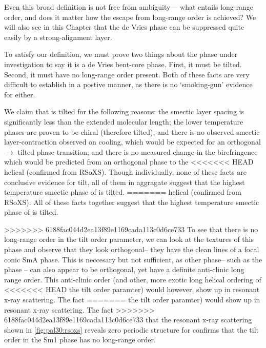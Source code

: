 \documentclass[aagreenthesis]{subfiles}
\begin{document}
Even this broad definition is not free from ambiguity--- what entails long-range
order, and does it matter how the escape from long-range order is achieved? We will also see in this Chapter that the de Vries phase can be
suppressed quite easily by a strong-alignment layer.



To satisfy our definition, we must prove two things about the phase under
investigation to say it is a de Vries bent-core phase. First, it must be tilted.
Second, it must have no long-range order present. Both of these facts are very
difficult to establish in a postive manner, as there is no `smoking-gun'
evidence for either.

We claim that \nfour{} is tilted for the following reasons: the smectic layer spacing is
significantly less than the extended molecular length; the lower temperature
phases are proven to be chiral (therefore tilted), and there is no observed
smectic layer-contraction observed on cooling, which would be expected for an
orthogonal$\rightarrow$ tilted phase transition; and there is no measured change in the birefringence which would be predicted from an orthogonal phase to the
<<<<<<< HEAD
helical \smcpalpha{} (confirmed from RSoXS). Though individually, none of
these facts are conclusive evidence for tilt, all of them in
aggragate suggest
that the highest temperature smectic phase of \nfour{} is tilted.
=======
helical \smcpalpha{} (confirmed from RSoXS). All of these facts together suggest
that the highest temperature smectic phase of \nfour{} is tilted.

>>>>>>> 6188fac044d2ea13f89e1169cada113c0d6ce733
To see that there is no long-range order in the tilt order parameter, we can
look at the textures of this phase and observe that they look orthogonal-- they
have the clean lines of a focal conic SmA phase. This
is neccesary but not sufficient, as other phase-- such as the \smcapa{} phase --
can also appear to be orthogonal, yet have a definite anti-clinic long range
order. This anti-clinic order (and other, more exotic long helical ordering of
<<<<<<< HEAD
the tilt order paramter) would however, show up in resonant x-ray
scattering. The fact
=======
the tilt order paramter) would show up in resonant x-ray scattering. The fact
>>>>>>> 6188fac044d2ea13f89e1169cada113c0d6ce733
that the resonant x-ray scattering shown in \autoref{fig:pal30:rsoxs} reveals
zero periodic structure for \nfour{} confirms that the tilt order in the Sm1
phase has no long-range order.
\end{document}
